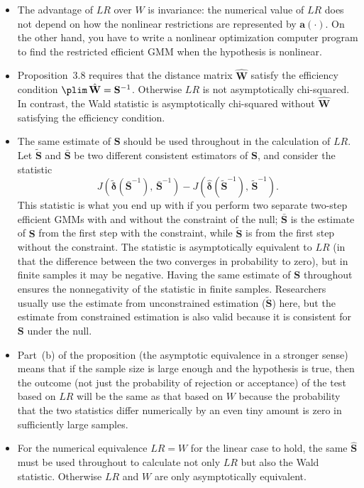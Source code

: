 \begin{itemize}
\item The advantage of $LR$ over $W$ is invariance: the numerical value of $LR$ does not
  depend on how the nonlinear restrictions are represented by $\mathbf{a}(\cdot)$.  On the other
  hand, you have to write a nonlinear optimization computer program to find the
  restricted efficient GMM when the hypothesis is nonlinear.

\item Proposition~3.8 requires that the distance matrix $\hat{\mathbf{W}}$ satisfy the efficiency
  condition $\plim\, \hat{\mathbf{W}} = \mathbf{S}^{-1}$.  Otherwise $LR$ is not asymptotically chi-squared.
  In contrast, the Wald statistic is asymptotically chi-squared without $\hat{\mathbf{W}}$
  satisfying the efficiency condition.

\item The same estimate of $\mathbf{S}$ should be used throughout in the calculation of $LR$.
  Let $\tilde{\mathbf{S}}$ and $\bar{\mathbf{S}}$ be two different consistent estimators of $\mathbf{S}$,
  and consider the statistic
  \[
    J(\tilde{\boldsymbol{\delta}}(\bar{\mathbf{S}}^{-1}),\, \bar{\mathbf{S}}^{-1})
    - J(\hat{\boldsymbol{\delta}}(\tilde{\mathbf{S}}^{-1}),\, \tilde{\mathbf{S}}^{-1}).
  \]
  This statistic is what you end up with if you perform two separate two-step efficient
  GMMs with and without the constraint of the null; $\bar{\mathbf{S}}$ is the estimate of $\mathbf{S}$
  from the first step with the constraint, while $\tilde{\mathbf{S}}$ is from the first step without the
  constraint.  The statistic is asymptotically equivalent to $LR$ (in that the difference
  between the two converges in probability to zero), but in finite samples it may
  be negative.  Having the same estimate of $\mathbf{S}$ throughout ensures the nonnegativity
  of the statistic in finite samples.  Researchers usually use the estimate from
  unconstrained estimation ($\tilde{\mathbf{S}}$) here, but the estimate from constrained estimation
  is also valid because it is consistent for $\mathbf{S}$ under the null.

\item Part~(b) of the proposition (the asymptotic equivalence in a stronger sense)
  means that if the sample size is large enough and the hypothesis is true, then the
  outcome (not just the probability of rejection or acceptance) of the test based
  on $LR$ will be the same as that based on $W$ because the probability that the two
  statistics differ numerically by an even tiny amount is zero in sufficiently large
  samples.

\item For the numerical equivalence $LR = W$ for the linear case to hold, the same
  $\hat{\mathbf{S}}$ must be used throughout to calculate not only $LR$ but also the Wald statistic.
  Otherwise $LR$ and $W$ are only asymptotically equivalent.
\end{itemize}

